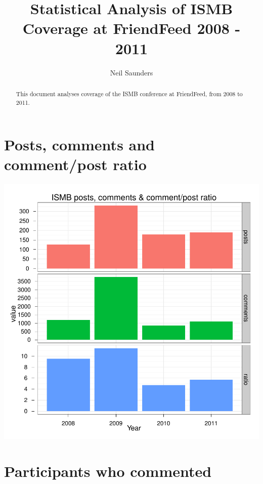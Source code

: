 \documentclass[a4paper,10pt]{article}
\title{Statistical Analysis of ISMB Coverage at FriendFeed 2008 - 2011}
\author{Neil Saunders}
\begin{document}
\maketitle

\begin{abstract}
This document analyses coverage of the ISMB conference at FriendFeed, from 2008 to 2011.
\end{abstract}

\section{Posts, comments and comment/post ratio}

\begin{center}
\includegraphics{ismb-004}
\end{center}

\section{Participants who commented}
\end{document}

